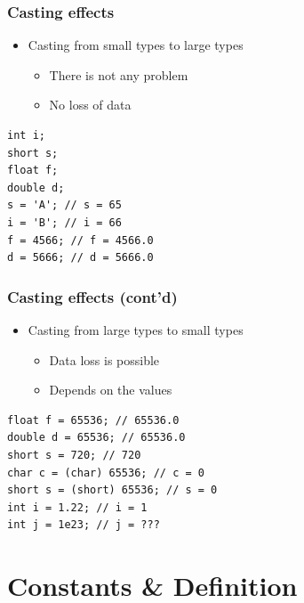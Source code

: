 \documentclass{../c-lecture}
\begin{document}
\begin{frame}[fragile]
  \frametitle{Casting effects}
  \begin{itemize}
    \item Casting from small types to large types
    \begin{itemize}
      \item There is not any problem
      \item No loss of data
    \end{itemize}
  \end{itemize}
  \begin{verbatim}
int i;
short s;
float f;
double d;
s = 'A'; // s = 65
i = 'B'; // i = 66
f = 4566; // f = 4566.0
d = 5666; // d = 5666.0
  \end{verbatim}
\end{frame}

\begin{frame}[fragile]
  \frametitle{Casting effects (cont’d)}
  \begin{itemize}
    \item Casting from large types to small types
    \begin{itemize}
      \item Data loss is possible
      \item Depends on the values
    \end{itemize}
  \end{itemize}
  \begin{verbatim}
float f = 65536; // 65536.0
double d = 65536; // 65536.0
short s = 720; // 720
char c = (char) 65536; // c = 0
short s = (short) 65536; // s = 0
int i = 1.22; // i = 1
int j = 1e23; // j = ???
  \end{verbatim}
\end{frame}

\section{Constants \& Definition}
\end{document}
